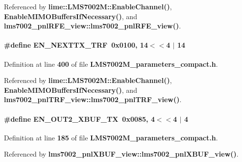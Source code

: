 Referenced by {\bf lime\+::\+L\+M\+S7002\+M\+::\+Enable\+Channel()}, {\bf Enable\+M\+I\+M\+O\+Buffers\+If\+Necessary()}, and {\bf lms7002\+\_\+pnl\+R\+F\+E\+\_\+view\+::lms7002\+\_\+pnl\+R\+F\+E\+\_\+view()}.

\paragraph[{E\+N\+\_\+\+N\+E\+X\+T\+T\+X\+\_\+\+T\+RF}]{\setlength{\rightskip}{0pt plus 5cm}\#define E\+N\+\_\+\+N\+E\+X\+T\+T\+X\+\_\+\+T\+RF~0x0100, 14$<$$<$4 $\vert$  14}\label{LMS7002M__parameters__compact_8h_a69f3a7d7f150faab28dcc75dde535465}


Definition at line {\bf 400} of file {\bf L\+M\+S7002\+M\+\_\+parameters\+\_\+compact.\+h}.



Referenced by {\bf lime\+::\+L\+M\+S7002\+M\+::\+Enable\+Channel()}, {\bf Enable\+M\+I\+M\+O\+Buffers\+If\+Necessary()}, and {\bf lms7002\+\_\+pnl\+T\+R\+F\+\_\+view\+::lms7002\+\_\+pnl\+T\+R\+F\+\_\+view()}.

\paragraph[{E\+N\+\_\+\+O\+U\+T2\+\_\+\+X\+B\+U\+F\+\_\+\+TX}]{\setlength{\rightskip}{0pt plus 5cm}\#define E\+N\+\_\+\+O\+U\+T2\+\_\+\+X\+B\+U\+F\+\_\+\+TX~0x0085, 4$<$$<$4 $\vert$  4}\label{LMS7002M__parameters__compact_8h_aabdea2a451d302c2be674a6640502e50}


Definition at line {\bf 185} of file {\bf L\+M\+S7002\+M\+\_\+parameters\+\_\+compact.\+h}.



Referenced by {\bf lms7002\+\_\+pnl\+X\+B\+U\+F\+\_\+view\+::lms7002\+\_\+pnl\+X\+B\+U\+F\+\_\+view()}.

